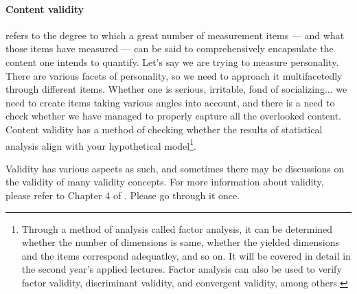 \documentclass{ltjbook}
\begin{document}
\paragraph{Content validity} refers to the degree to which a great number of measurement items — and what those items have measured — can be said to comprehensively encapsulate the content one intends to quantify. Let’s say we are trying to measure personality. There are various facets of personality, so we need to approach it multifacetedly through different items. Whether one is serious, irritable, fond of socializing... we need to create items taking various angles into account, and there is a need to check whether we have managed to properly capture all the overlooked content. Content validity has a method of checking whether the results of statistical analysis align with your hypothetical model\footnote{Through a method of analysis called factor analysis, it can be determined whether the number of dimensions is same, whether the yielded dimensions and the items correspond adequatley, and so on. It will be covered in detail in the second year's applied lectures. Factor analysis can also be used to verify factor validity, discriminant validity, and convergent validity, among others.}.


Validity has various aspects as such, and sometimes there may be discussions on the validity of many validity concepts. For more information about validity, please refer to Chapter 4 of \textcite{kosugi2016b}. Please go through it once.
\end{document}
